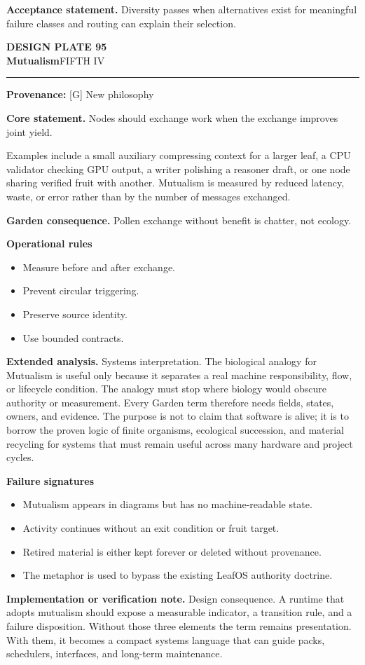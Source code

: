\documentclass[10pt,letterpaper,oneside]{article}
\newcommand{\prov}[1]{\textcolor{gardenBlue}{\sffamily\footnotesize\textbf{Provenance:} #1}}
\newcommand{\platetitle}[3]{%
  \begin{minipage}[t][0.54in][t]{\textwidth}
  {\sffamily\bfseries\color{gardenDeep}\fontsize{9}{10}\selectfont DESIGN PLATE #1}\\[-1pt]
  {\sffamily\bfseries\color{gardenInk}\fontsize{16.5}{18}\selectfont #2}\hfill{\sffamily\color{gardenGreen}\large #3}
  \end{minipage}\vspace{-2pt}\hrule\vspace{5pt}}
\begin{document}
\begin{acceptbox}
\textbf{Acceptance statement.} Diversity passes when alternatives exist for meaningful failure classes and routing can explain their selection.
\end{acceptbox}
\newpage
\platetitle{95}{Mutualism}{FIFTH IV}
\prov{[G] New philosophy}
\fontsize{8.85}{10.45}\selectfont
\begin{corebox}
\textbf{Core statement.} Nodes should exchange work when the exchange improves joint yield.
\end{corebox}
Examples include a small auxiliary compressing context for a larger leaf, a CPU validator checking GPU output, a writer polishing a reasoner draft, or one node sharing verified fruit with another. Mutualism is measured by reduced latency, waste, or error rather than by the number of messages exchanged.

\textbf{Garden consequence.} Pollen exchange without benefit is chatter, not ecology.

\textbf{Operational rules}
\begin{itemize}
\item Measure before and after exchange.
\item Prevent circular triggering.
\item Preserve source identity.
\item Use bounded contracts.
\end{itemize}
\textbf{Extended analysis.} Systems interpretation. The biological analogy for Mutualism is useful only because it separates a real machine responsibility, flow, or lifecycle condition. The analogy must stop where biology would obscure authority or measurement. Every Garden term therefore needs fields, states, owners, and evidence. The purpose is not to claim that software is alive; it is to borrow the proven logic of finite organisms, ecological succession, and material recycling for systems that must remain useful across many hardware and project cycles.

\textbf{Failure signatures}
\begin{itemize}
\item Mutualism appears in diagrams but has no machine-readable state.
\item Activity continues without an exit condition or fruit target.
\item Retired material is either kept forever or deleted without provenance.
\item The metaphor is used to bypass the existing LeafOS authority doctrine.
\end{itemize}
\textbf{Implementation or verification note.} Design consequence. A runtime that adopts mutualism should expose a measurable indicator, a transition rule, and a failure disposition. Without those three elements the term remains presentation. With them, it becomes a compact systems language that can guide packs, schedulers, interfaces, and long-term maintenance.
\end{document}

